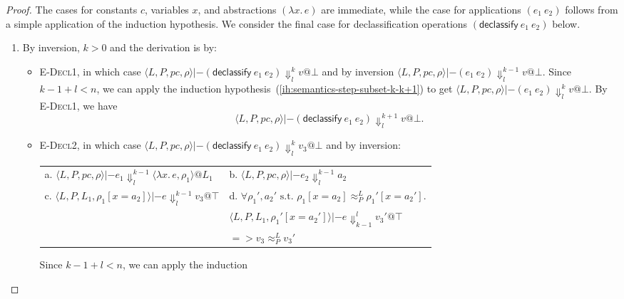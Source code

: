 \documentclass{article}
\makeatletter
\theoremstyle{definition}
\newcommand{\at}{\ensuremath{{\scriptstyle{@}}}}
\newcommand{\pc}{\ensuremath{{\mathit{pc}}}}
\makeatother
\begin{document}
\begin{proof}
  The cases for constants $c$, variables $x$, and abstractions
  $(\lambda{x}.\, e)$ are immediate, while the case for applications
  $(e_1\ e_2)$ follows from a simple application of the induction hypothesis.
  We consider the final case for declassification operations
  $(\mathsf{declassify}\ e_1\ e_2)$ below.
  \begin{enumerate}
  \item By inversion, $k > 0$ and the derivation is by:
    \begin{itemize}
    \item \textsc{E-Decl1}, in which case
      $\langle{L, P, \pc, \rho\rangle} |- (\mathsf{declassify}\ e_1\ e_2)
      \Downarrow^{k}_{l} v \at \bot$ and by inversion
      $\langle{L, P, \pc, \rho\rangle} |- (e_1\ e_2) \Downarrow^{k-1}_{l}
      v \at \bot$. Since $k-1 + l < n$, we can apply the induction
      hypothesis~(\ref{ih:semantics-step-subset-k-k+1}) to get
      $\langle{L, P, \pc, \rho\rangle} |- (e_1\ e_2) \Downarrow^{k}_{l}
      v \at \bot$. By \textsc{E-Decl1}, we have
      \[\langle{L, P, \pc, \rho\rangle} |- (\mathsf{declassify}\ e_1\ e_2)
      \Downarrow^{k+1}_{l} v \at \bot.\]
    \item \textsc{E-Decl2}, in which case
      $\langle{L, P, \pc, \rho\rangle} |- (\mathsf{declassify}\ e_1\ e_2)
      \Downarrow^{k}_{l} v_3 \at \bot$ and by inversion:
      \begin{center}
        \begin{tabular*}{1.0\linewidth}{ll}
          a.
          $\langle{L, P, \pc, \rho\rangle} |- e_1
          \Downarrow^{k-1}_{l}
          \langle{\lambda{x}.\, e, \rho_1\rangle} \at L_1$
          &
          b.
          $\langle{L, P, \pc, \rho\rangle} |- e_2
          \Downarrow^{k-1}_{l}
          a_2$
          \\[1.8ex]
          c.
          $\langle{L, P, L_1, \rho_1[x = a_2]\rangle} |- e
          \Downarrow^{k-1}_{l}
          v_3 \at \top$
          &
          d.
          $\forall{\rho_1', a_2' \text{ s.t. }
            \rho_1[x = a_2] \approx^{L}_{P} \rho_1'[x = a_2']}.$
          \\
          &
          \quad\quad
          $\langle{L, P, L_1, \rho_1'[x = a_2']\rangle} |- e
          \Downarrow^{l}_{k-1} v_3' \at \top$
          \\
          &
          \quad\quad
          $=>
          v_3 \approx^{L}_{P} v_3'$
        \end{tabular*}
      \end{center}
      Since $k-1 + l < n$, we can apply the induction

\end{itemize}
\end{enumerate}
\end{proof}
\end{document}

